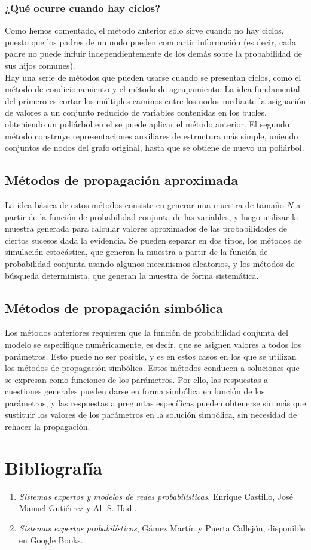 \documentclass{article}
\theoremstyle{definition_wo_parentheses}
\begin{document}
\subsubsection{¿Qué ocurre cuando hay ciclos?}
Como hemos comentado, el método anterior sólo sirve cuando no hay ciclos, puesto que los padres de un nodo pueden compartir información (es decir, cada padre no puede influir independientemente de los demás sobre la probabilidad de sus hijos comunes).\\
Hay una serie de métodos que pueden usarse cuando se presentan ciclos, como el método de condicionamiento y el método de agrupamiento. La idea fundamental del primero es cortar los múltiples caminos entre los nodos mediante la asignación de valores a un conjunto reducido de variables contenidas en los bucles, obteniendo un poliárbol en el se puede aplicar el método anterior. El segundo método construye representaciones auxiliares de estructura más simple, uniendo conjuntos de nodos del grafo original, hasta que se obtiene de nuevo un poliárbol.

\subsection{Métodos de propagación aproximada}

La idea básica de estos métodos consiste en generar una muestra de tamaño $N$ a partir de la función de probabilidad conjunta de las variables, y luego utilizar la muestra generada para calcular valores aproximados de las probabilidades de ciertos sucesos dada la evidencia. Se pueden separar en dos tipos, los métodos de simulación estocástica, que generan la muestra a partir de la función de probabilidad conjunta usando algunos mecanismos aleatorios, y los métodos de búsqueda determinista, que generan la muestra de forma sistemática.

\subsection{Métodos de propagación simbólica}

Los métodos anteriores requieren que la función de probabilidad conjunta del modelo se especifique numéricamente, es decir, que se asignen valores a todos los parámetros. Esto puede no ser posible, y es en estos casos en los que se utilizan los métodos de propagación simbólica. Estos métodos conducen a soluciones que se expresan como funciones de los parámetros. Por ello, las respuestas a cuestiones generales pueden darse en forma simbólica en función de los parámetros, y las respuestas a preguntas específicas pueden obtenerse sin más que sustituir los valores de los parámetros en la solución simbólica, sin necesidad de rehacer la propagación.

\section{Bibliografía}

\begin{enumerate}
\item \textit{Sistemas expertos y modelos de redes probabilísticas}, Enrique Castillo, José Manuel Gutiérrez y Ali S. Hadi.
\item \textit{Sistemas expertos probabilísticos}, Gámez Martín y Puerta Callejón, disponible en Google Books.
\end{enumerate}
\end{document}
